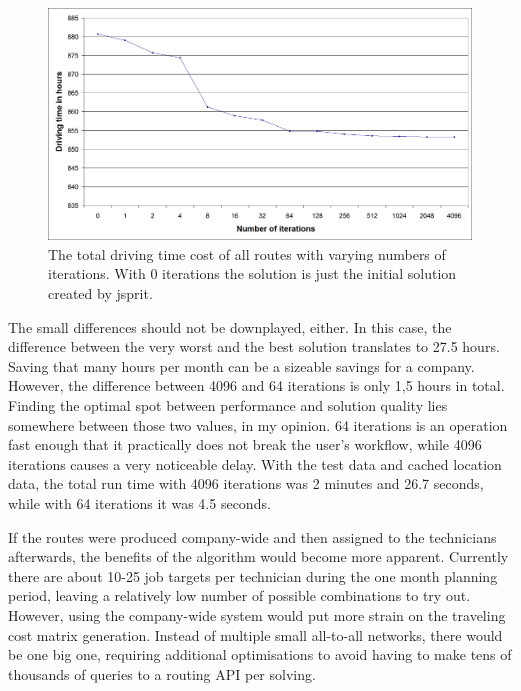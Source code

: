 \begin{figure}[h]
  \begin{center}
    \includegraphics[width=\textwidth]{images/iterations.png}
    \caption{The total driving time cost of all routes with varying numbers of iterations. With 0 iterations the solution is just the initial solution created by jsprit.}
    \label{fig:iterations}
  \end{center}
\end{figure} 

The small differences should not be downplayed, either. In this case, the difference between the very worst and the best solution translates to 27.5 hours. Saving that many hours per month can be a sizeable savings for a company. However, the difference between 4096 and 64 iterations is only 1,5 hours in total. Finding the optimal spot between performance and solution quality lies somewhere between those two values, in my opinion. 64 iterations is an operation fast enough that it practically does not break the user's workflow, while 4096 iterations causes a very noticeable delay. With the test data and cached location data, the total run time with 4096 iterations was 2 minutes and 26.7 seconds, while with 64 iterations it was 4.5 seconds.

If the routes were produced company-wide and then assigned to the technicians afterwards, the benefits of the algorithm would become more apparent. Currently there are about 10-25 job targets per technician during the one month planning period, leaving a relatively low number of possible combinations to try out. However, using the company-wide system would put more strain on the traveling cost matrix generation. Instead of multiple small all-to-all networks, there would be one big one, requiring additional optimisations to avoid having to make tens of thousands of queries to a routing API per solving.   




